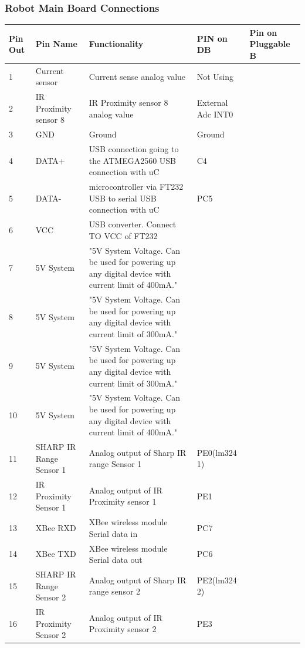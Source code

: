 \documentclass[a4paper,10pt,oneside]{article}
\begin{document}
{		\subsubsection{\Large\textbf{Robot Main Board Connections}}
			\begin{longtable}{|p{}|p{}|p{}|p{.1\textwidth}|p{}|}\hline
				Pin Out&	Pin Name&	Functionality&	PIN on DB& Pin on Pluggable B\\ \hline
				1&	Current sensor&	Current sense analog value&	Not Using\\ \hline
				2&	IR Proximity sensor 8&	IR Proximity sensor 8 analog value&	External Adc INT0\\ \hline
				3&	GND&	Ground	&Ground\\ \hline
				4&	DATA+&	USB connection going to the ATMEGA2560	USB connection with uC & C4\\ \hline
				5&	DATA-&	microcontroller via FT232 USB to serial	USB connection with uC &PC5\\ \hline
				6&	VCC& USB	converter.	Connect TO VCC of FT232&\\ \hline
				7&	5V System&	"5V System Voltage. Can be used for powering
				up any digital device with current limit of
				400mA."	&\\ \hline
				8&	5V System&	"5V System Voltage. Can be used for powering
				up any digital device with current limit of
				300mA."	&\\ \hline
				9&	5V System&	"5V System Voltage. Can be used for powering
				up any digital device with current limit of
				300mA."	&\\ \hline
				10&	5V System&	"5V System Voltage. Can be used for powering
				up any digital device with current limit of
				400mA."	&\\ \hline
				11&	SHARP IR Range Sensor 1	&Analog output of Sharp IR range Sensor 1&	PE0(lm324 1)\\ \hline
				12&	IR Proximity Sensor 1&	Analog output of IR Proximity sensor 1&	PE1\\ \hline
				13&	XBee RXD&	XBee wireless module Serial data in	&PC7\\ \hline
				14&	XBee TXD&	XBee wireless module Serial data out&	PC6\\ \hline
				15&	SHARP IR Range Sensor 2	& Analog output of Sharp IR range sensor 2&	PE2(lm324 2)\\ \hline
				16&	IR Proximity Sensor 2&	Analog output of IR Proximity sensor 2&	PE3\\ \hline

\end{longtable}}
\end{document}
